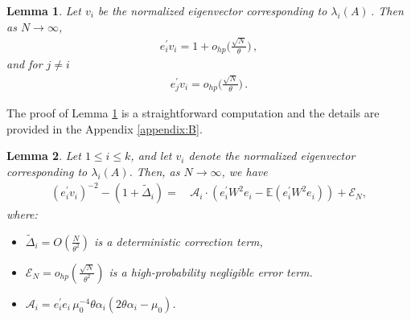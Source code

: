 \documentclass[11pt, reqno]{amsart}
\numberwithin{equation}{section}
\newtheorem{lemma}{Lemma}[section]
\begin{document}
\begin{lemma}\label{Align.bounds}
Let $v_i$ be the normalized eigenvector corresponding to $\lambda_i(A)$\,. Then as $N\to \infty$,
\begin{align}
\label{Align.Bound.along}e_i^\prime v_i = 1 + o_{hp}\bigg(\frac{\sqrt{N}}{\theta}\bigg)\,,
\end{align}and for $j \ne i$
\begin{align}
\label{Align.Bound.ortho}e_j^\prime v_i = o_{hp}\bigg(\frac{\sqrt{N}}{\theta}\bigg)\,.
\end{align}
\end{lemma}

The proof of Lemma \ref{Align.bounds} is a straightforward computation and the details are provided in the Appendix \ref{appendix:B}.
\begin{lemma}\label{EVec.pivot2} 
Let \(1 \leq i \leq k\), and let \(v_i\) denote the normalized eigenvector corresponding to \(\lambda_i(A)\). Then, as \(N \to \infty\), we have
\begin{align}
(e_i^\prime v_i)^{-2} - (1 + \tilde \Delta_i) 
=\, & \mathcal A_i\cdot\left(e_i^\prime W^2 e_i - \mathbb{E}(e_i^\prime W^2 e_i)\right)
 + \mathcal{E}_N,
\label{EVec.pivot2.target}
\end{align}
where:
\begin{itemize}
    \item[(a)] \(\tilde \Delta_i = O\left(\frac{N}{\theta^2}\right)\) is a deterministic correction term,
    \item[(b)] \(\mathcal{E}_N = o_{hp}\left(\frac{\sqrt{N}}{\theta^2}\right)\) is a high-probability negligible error term.
    \item[(c)] $\mathcal A_i=e_i^\prime e_i\, \mu_0^{-4}\theta\alpha_i(2\theta\alpha_i - \mu_0)$.
\end{itemize}
\end{lemma}
\end{document}
